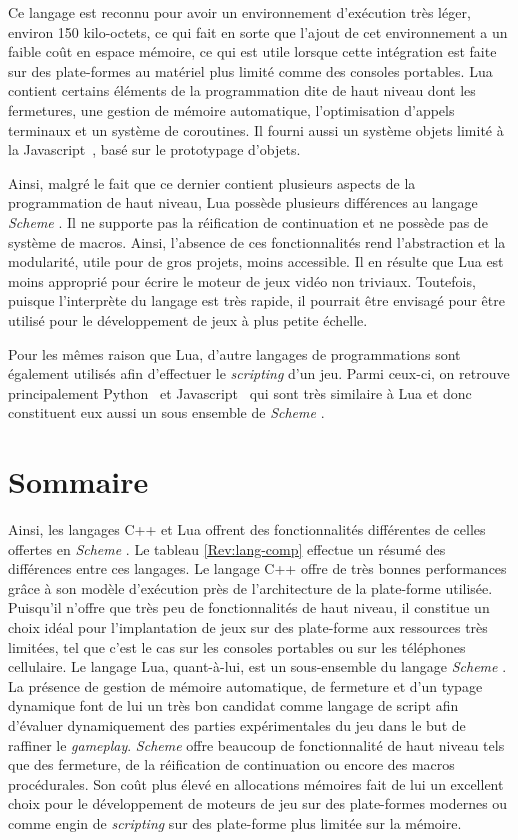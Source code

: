 \documentclass[12pt,twoside,letterpaper,francais]{book}
\newcommand{\Schemelang}{{\textit{Scheme }}}
\begin{document}
Ce langage est reconnu pour avoir un environnement d'exécution très
léger, environ 150 kilo-octets, ce qui fait en sorte que l'ajout de
cet environnement a un faible coût en espace mémoire, ce qui est utile
lorsque cette intégration est faite sur des plate-formes au matériel
plus limité comme des consoles portables. Lua contient certains
éléments de la programmation dite de haut niveau dont les fermetures,
une gestion de mémoire automatique, l'optimisation d'appels terminaux
et un système de coroutines. Il fourni aussi un système objets limité à
la Javascript~\cite{ECMA-262}, basé sur le prototypage d'objets.

Ainsi, malgré le fait que ce dernier contient plusieurs aspects de la
programmation de haut niveau, Lua possède plusieurs différences au
langage \Schemelang. Il ne supporte pas la réification de continuation et
ne possède pas de système de macros. Ainsi, l'absence de ces
fonctionnalités rend l'abstraction et la modularité, utile pour de
gros projets, moins accessible. Il en résulte que Lua est moins
approprié pour écrire le moteur de jeux vidéo non triviaux. Toutefois,
puisque l'interprète du langage est très rapide, il pourrait être
envisagé pour être utilisé pour le développement de jeux à plus petite
échelle.

Pour les mêmes raison que Lua, d'autre langages de programmations sont
également utilisés afin d'effectuer le \textit{scripting} d'un
jeu. Parmi ceux-ci, on retrouve principalement Python~\cite{Python} et
Javascript~\cite{ECMA-262} qui sont très similaire à Lua et donc
constituent eux aussi un sous ensemble de \Schemelang.


\FloatBarrier
\section{Sommaire}
Ainsi, les langages C++ et Lua offrent des fonctionnalités différentes
de celles offertes en \Schemelang. Le tableau \ref{Rev:lang-comp}
effectue un résumé des différences entre ces langages. Le langage C++
offre de très bonnes performances grâce à son modèle d'exécution près
de l'architecture de la plate-forme utilisée. Puisqu'il n'offre que
très peu de fonctionnalités de haut niveau, il constitue un choix
idéal pour l'implantation de jeux sur des plate-forme aux ressources
très limitées, tel que c'est le cas sur les consoles portables ou sur
les téléphones cellulaire. Le langage Lua, quant-à-lui, est un
sous-ensemble du langage \Schemelang. La présence de gestion de
mémoire automatique, de fermeture et d'un typage dynamique font de lui
un très bon candidat comme langage de script afin d'évaluer
dynamiquement des parties expérimentales du jeu dans le but de
raffiner le \textit{gameplay}. \Schemelang offre beaucoup de
fonctionnalité de haut niveau tels que des fermeture, de la
réification de continuation ou encore des macros procédurales. Son
coût plus élevé en allocations mémoires fait de lui un excellent choix
pour le développement de moteurs de jeu sur des plate-formes modernes
ou comme engin de \textit{scripting} sur des plate-forme plus limitée
sur la mémoire.
\end{document}
